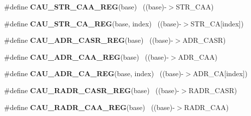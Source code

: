 \begin{DoxyCompactItemize}
\item 
\hypertarget{group___c_a_u___register___accessor___macros_ga2ab1f71102febc9ff8197fe72bf06a6a}{}\#define {\bfseries C\+A\+U\+\_\+\+S\+T\+R\+\_\+\+C\+A\+A\+\_\+\+R\+E\+G}(base)                                    ~((base)-\/$>$S\+T\+R\+\_\+\+C\+A\+A)\label{group___c_a_u___register___accessor___macros_ga2ab1f71102febc9ff8197fe72bf06a6a}

\item 
\hypertarget{group___c_a_u___register___accessor___macros_ga678495dbbf9c1fac26ad2eeef0abab43}{}\#define {\bfseries C\+A\+U\+\_\+\+S\+T\+R\+\_\+\+C\+A\+\_\+\+R\+E\+G}(base,  index)                          ~((base)-\/$>$S\+T\+R\+\_\+\+C\+A\mbox{[}index\mbox{]})\label{group___c_a_u___register___accessor___macros_ga678495dbbf9c1fac26ad2eeef0abab43}

\item 
\hypertarget{group___c_a_u___register___accessor___macros_ga7c58e074c66d5435060ebf0f59d0d1aa}{}\#define {\bfseries C\+A\+U\+\_\+\+A\+D\+R\+\_\+\+C\+A\+S\+R\+\_\+\+R\+E\+G}(base)                                  ~((base)-\/$>$A\+D\+R\+\_\+\+C\+A\+S\+R)\label{group___c_a_u___register___accessor___macros_ga7c58e074c66d5435060ebf0f59d0d1aa}

\item 
\hypertarget{group___c_a_u___register___accessor___macros_ga3c65f37d996bed2287554edf39d073ac}{}\#define {\bfseries C\+A\+U\+\_\+\+A\+D\+R\+\_\+\+C\+A\+A\+\_\+\+R\+E\+G}(base)                                    ~((base)-\/$>$A\+D\+R\+\_\+\+C\+A\+A)\label{group___c_a_u___register___accessor___macros_ga3c65f37d996bed2287554edf39d073ac}

\item 
\hypertarget{group___c_a_u___register___accessor___macros_ga67a4ae83e82daf32d4ee4a4d48a7366c}{}\#define {\bfseries C\+A\+U\+\_\+\+A\+D\+R\+\_\+\+C\+A\+\_\+\+R\+E\+G}(base,  index)                          ~((base)-\/$>$A\+D\+R\+\_\+\+C\+A\mbox{[}index\mbox{]})\label{group___c_a_u___register___accessor___macros_ga67a4ae83e82daf32d4ee4a4d48a7366c}

\item 
\hypertarget{group___c_a_u___register___accessor___macros_ga52e191a3e57608d90fe8b76ec10268bf}{}\#define {\bfseries C\+A\+U\+\_\+\+R\+A\+D\+R\+\_\+\+C\+A\+S\+R\+\_\+\+R\+E\+G}(base)                                ~((base)-\/$>$R\+A\+D\+R\+\_\+\+C\+A\+S\+R)\label{group___c_a_u___register___accessor___macros_ga52e191a3e57608d90fe8b76ec10268bf}

\item 
\hypertarget{group___c_a_u___register___accessor___macros_ga6aa232c807c88b56ba3c47166a90bcaf}{}\#define {\bfseries C\+A\+U\+\_\+\+R\+A\+D\+R\+\_\+\+C\+A\+A\+\_\+\+R\+E\+G}(base)                                  ~((base)-\/$>$R\+A\+D\+R\+\_\+\+C\+A\+A)\label{group___c_a_u___register___accessor___macros_ga6aa232c807c88b56ba3c47166a90bcaf}


\end{DoxyCompactItemize}
